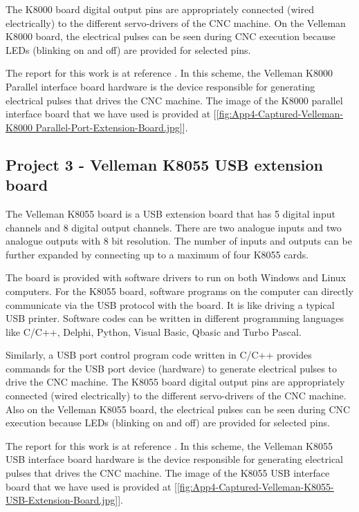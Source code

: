 The K8000 board digital output pins are appropriately connected (wired electrically) to the different servo-drivers of the CNC machine. On the Velleman K8000 board, the electrical pulses can be seen during CNC execution because LEDs (blinking on and off) are provided for selected pins.
\vspace*{1\baselineskip}

The report for this work is at reference \cite{FYP_Abzal_2012}.	In this scheme, the Velleman K8000 Parallel interface board hardware is the device responsible for generating electrical pulses that drives the CNC machine. The image of the K8000 parallel interface board that we have used is provided at [\ref{fig:App4-Captured-Velleman-K8000 Parallel-Port-Extension-Board.jpg}].

\subsection{Project 3 - Velleman K8055 USB extension board}

The Velleman K8055 board is a USB extension board that has 5 digital input channels and 8 digital output channels. There are two analogue inputs and two analogue outputs with 8 bit resolution. The number of inputs and outputs can be further expanded by connecting up to a maximum of four K8055 cards. 
\vspace*{1\baselineskip}

The board is provided with software drivers to run on both Windows and Linux computers. For the K8055 board, software programs on the computer can directly communicate via the USB protocol with the board. It is like driving a typical USB printer. Software codes can be written in different programming languages like C/C++, Delphi, Python, Visual Basic, Qbasic and Turbo Pascal.
\vspace*{1\baselineskip}

Similarly, a USB port control program code written in C/C++ provides commands for the USB port device (hardware) to generate electrical pulses to drive the CNC machine. The K8055 board digital output pins are appropriately connected (wired electrically) to the different servo-drivers of the CNC machine. Also on the Velleman K8055 board, the electrical pulses can be seen during CNC execution because LEDs (blinking on and off) are provided for selected pins.
\vspace*{1\baselineskip}

The report for this work is at reference \cite{FYP_Rajeef_2015}. In this scheme, the Velleman K8055 USB interface board hardware is the device responsible for generating electrical pulses that drives the CNC machine. The image of the K8055 USB interface board that we have used is provided at [\ref{fig:App4-Captured-Velleman-K8055-USB-Extension-Board.jpg}]. 

